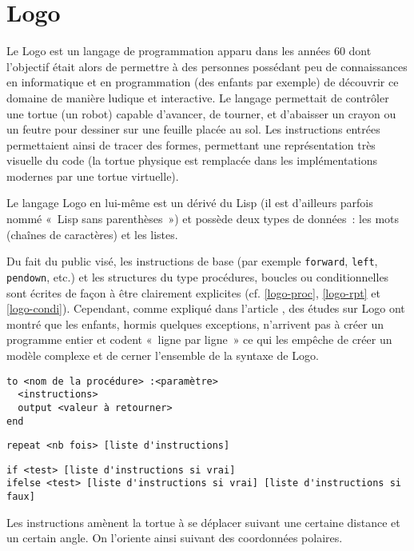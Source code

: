 \section{Logo}
\label{Logo}

Le Logo est un langage de programmation apparu dans les années 60 dont l'objectif était alors de permettre à des personnes possédant peu de connaissances en informatique et en programmation (des enfants par exemple) de découvrir ce domaine de manière ludique et interactive. Le langage permettait de contrôler une tortue (un robot) capable d'avancer, de tourner, et d'abaisser un crayon ou un feutre pour dessiner sur une feuille placée au sol. Les instructions entrées permettaient ainsi de tracer des formes, permettant une représentation très visuelle du code (la tortue physique est remplacée dans les implémentations modernes par une tortue virtuelle).

Le langage Logo en lui-même est un dérivé du Lisp (il est d'ailleurs parfois nommé «~Lisp sans parenthèses~») et possède deux types de données~: les mots (chaînes de caractères) et les listes.

Du fait du public visé, les instructions de base (par exemple \verb|forward|, \verb|left|, \verb|pendown|, etc.) et les structures du type procédures, boucles ou conditionnelles sont écrites de façon à être clairement explicites (cf. \ref{logo-proc}, \ref{logo-rpt} et \ref{logo-condi}).
Cependant, comme expliqué dans l'article \cite{Logo}, des études sur Logo ont montré que les enfants, hormis quelques exceptions, n'arrivent pas à créer un programme entier et codent «~ligne par ligne~» ce qui les empêche de créer un modèle complexe et de cerner l'ensemble de la syntaxe de Logo.

\begin{lstlisting}[language=Logo,label=logo-proc,caption=Procédure en Logo]
to <nom de la procédure> :<paramètre>
  <instructions>
  output <valeur à retourner>
end
\end{lstlisting}

\begin{lstlisting}[language=Logo,label=logo-rpt,caption=Boucle en Logo]
repeat <nb fois> [liste d'instructions]
\end{lstlisting}

\begin{lstlisting}[language=Logo,label=logo-condi,caption=Conditionnelles en Logo]
if <test> [liste d'instructions si vrai]
ifelse <test> [liste d'instructions si vrai] [liste d'instructions si faux]
\end{lstlisting}

Les instructions amènent la tortue à se déplacer suivant une certaine distance et un certain angle. On l'oriente ainsi suivant des coordonnées polaires.
